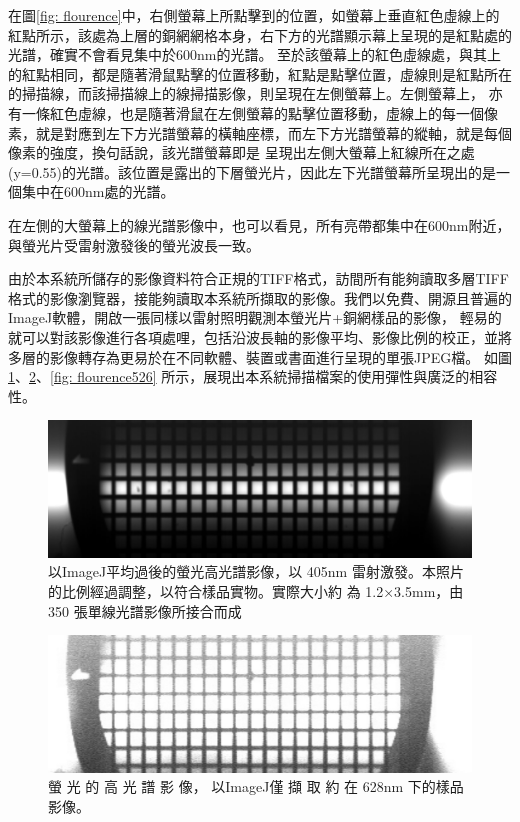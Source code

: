 \documentclass[12pt]{article}
\begin{document}
在圖\ref{fig: flourence}中，右側螢幕上所點擊到的位置，如螢幕上垂直紅色虛線上的紅點所示，該處為上層的銅網網格本身，右下方的光譜顯示幕上呈現的是紅點處的光譜，確實不會看見集中於600nm的光譜。
至於該螢幕上的紅色虛線處，與其上的紅點相同，都是隨著滑鼠點擊的位置移動，紅點是點擊位置，虛線則是紅點所在的掃描線，而該掃描線上的線掃描影像，則呈現在左側螢幕上。左側螢幕上，
亦有一條紅色虛線，也是隨著滑鼠在左側螢幕的點擊位置移動，虛線上的每一個像素，就是對應到左下方光譜螢幕的橫軸座標，而左下方光譜螢幕的縱軸，就是每個像素的強度，換句話說，該光譜螢幕即是
呈現出左側大螢幕上紅線所在之處(y=0.55)的光譜。該位置是露出的下層螢光片，因此左下光譜螢幕所呈現出的是一個集中在600nm處的光譜。

在左側的大螢幕上的線光譜影像中，也可以看見，所有亮帶都集中在600nm附近，與螢光片受雷射激發後的螢光波長一致。

由於本系統所儲存的影像資料符合正規的TIFF格式，訪間所有能夠讀取多層TIFF格式的影像瀏覽器，接能夠讀取本系統所擷取的影像。我們以免費、開源且普遍的ImageJ軟體，開啟一張同樣以雷射照明觀測本螢光片+銅網樣品的影像，
輕易的就可以對該影像進行各項處哩，包括沿波長軸的影像平均、影像比例的校正，並將多層的影像轉存為更易於在不同軟體、裝置或書面進行呈現的單張JPEG檔。
如圖\ref{fig: flourenceAvg}、\ref{fig: flourence628}、\ref{fig: flourence526}
所示，展現出本系統掃描檔案的使用彈性與廣泛的相容性。

\begin{figure}
    \centering
    \includegraphics[width = 0.9\linewidth]{AVG_1211_10um_15msLaser.tiff-2.jpg}
    \caption[以ImageJ平均過後的螢光高光譜影像]{以ImageJ平均過後的螢光高光譜影像，以 405nm 雷射激發。本照片的比例經過調整，以符合樣品實物。實際大小約
    為 1.2×3.5mm，由 350 張單線光譜影像所接合而成}
    \label{fig: flourenceAvg}
\end{figure}

\begin{figure}
    \centering
    \includegraphics[width = 0.9\linewidth]{1211_10um_15msLaser-1.jpg}
    \caption[螢光的高光譜影像]{螢 光 的 高 光 譜 影 像， 以ImageJ僅 擷 取 約 在
    628nm 下的樣品影像。}
    \label{fig: flourence628}
\end{figure}
\end{document}
